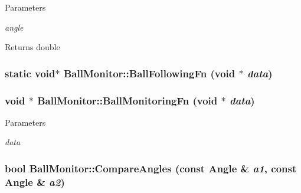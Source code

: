 \begin{DoxyParams}{Parameters}
\item[{\em angle}]\end{DoxyParams}
\begin{DoxyReturn}{Returns}
double 
\end{DoxyReturn}
\hypertarget{classBallMonitor_a2ca3e25f437b5aabb3bc88e0f84cf9a5}{
\subsubsection[{BallFollowingFn}]{\setlength{\rightskip}{0pt plus 5cm}static void$\ast$ BallMonitor::BallFollowingFn (void $\ast$ {\em data})}}
\label{classBallMonitor_a2ca3e25f437b5aabb3bc88e0f84cf9a5}
\hypertarget{classBallMonitor_af76da8bc13e92d9083a9a77469c472df}{
\subsubsection[{BallMonitoringFn}]{\setlength{\rightskip}{0pt plus 5cm}void $\ast$ BallMonitor::BallMonitoringFn (void $\ast$ {\em data})}}
\label{classBallMonitor_af76da8bc13e92d9083a9a77469c472df}

\begin{DoxyParams}{Parameters}
\item[{\em data}]\end{DoxyParams}
\hypertarget{classBallMonitor_a78114ec7fc20317f84491e428dd8c126}{
\subsubsection[{CompareAngles}]{\setlength{\rightskip}{0pt plus 5cm}bool BallMonitor::CompareAngles (const {\bf Angle} \& {\em a1}, \/  const {\bf Angle} \& {\em a2})}}
\label{classBallMonitor_a78114ec7fc20317f84491e428dd8c126}

